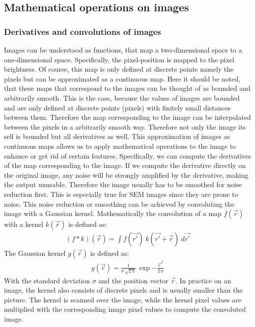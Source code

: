\documentclass[12pt,english,twocolumn]{revtex4}
\begin{document}
\subsection{Mathematical operations on images}
\subsubsection{Derivatives and convolutions of images} \label{sec:how_to_derive_images}
Images can be understood as functions, that map a two-dimensional space to a one-dimensional space. Specifically, the pixel-position is mapped to the pixel brightness. Of course, this map is only defined at discrete points namely the pixels but can be approximated as a continuous map. Here it should be noted, that these maps that correspond to the images can be thought of as bounded and arbitrarily smooth. This is the case, because the values of images are bounded and are only defined at discrete points (pixels) with finitely small distances between them. Therefore the map corresponding to the image can be interpolated between the pixels in a arbitrarily smooth way. Therefore not only the image its self is bounded but all derivatives as well. This approximation of images as continuous maps allows us to apply mathematical operations to the image to enhance or get rid of certain features. Specifically, we can compute the derivatives of the map corresponding to the image. If we compute the derivative directly on the original image, any noise will be strongly amplified by the derivative, making the output unusable. Therefore the image usually has to be smoothed for noise reduction first. This is especially true for SEM images since they are prone to noise. This noise reduction or smoothing can be achieved by convoluting the image with a Gaussian kernel. Mathematically the convolution of a map $f(\Vec{r})$ with a kernel $k(\Vec{r})$ is defined as:\\
\begin{align*}
    (f * k)(\Vec{r}) = \int f(\Vec{r'}) \ k(\Vec{r'} + \Vec{r}) \ d\Vec{r'}
\end{align*}
The Gaussian kernel $g(\Vec{r})$ is defined as:
\begin{align*}
    g(\Vec{r}) = \frac{1}{\sigma \, \sqrt{2 \, \pi}} \, \exp{-\frac{\Vec{r\,}^2}{2 \, \sigma}}
\end{align*}
With the standard deviation $\sigma$ and the position vector $\Vec{r}$. In practice on an image, the kernel also consists of discrete pixels and is usually smaller than the picture. The kernel is scanned over the image, while the kernel pixel values are multiplied with the corresponding image pixel values to compute the convoluted image.\\
\end{document}
